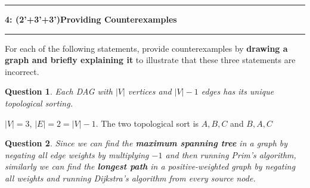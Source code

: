 \documentclass[10.5pt]{article}
\newcommand\question[2]{\vspace{.25in}\hrule\textbf{#1: #2}\vspace{.5em}\hrule\vspace{.10in}}
\newtheorem{Q}{Question}
\begin{document}
\question{4}{(2'+3'+3')Providing Counterexamples}
For each of the following statements, provide counterexamples by \textbf{drawing a graph and briefly explaining it} to illustrate that these three statements are incorrect.
\begin{Q}
	Each DAG with $|V|$ vertices and $|V|-1$ edges has its unique topological sorting.
\end{Q}
\begin{center}
\end{center}
$|V| = 3$, $|E| = 2 = |V| - 1$. The two topological sort is $A, B, C$ and $B, A, C$\\
\begin{Q}
	Since we can find the \textbf{maximum spanning tree} in a graph by negating all edge weights by multiplying $-1$ and then running Prim's algorithm, similarly we can find the \textbf{longest path} in a positive-weighted graph by negating all weights and running Dijkstra's algorithm from every source node.
\end{Q}
\begin{center}
\end{center}
\end{document}
